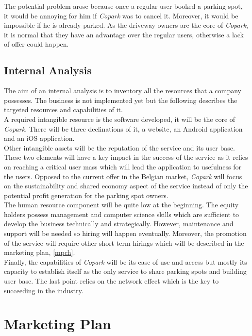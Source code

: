 \documentclass[12pt,a4paper,oneside]{book}
\newcommand{\bp}{\textit{Copark}}
\begin{document}
The potential problem arose because once a regular user booked a parking spot, it would be annoying for him if \bp{} was to cancel it. Moreover, it would be impossible if he is already parked. As the driveway owners are the core of \bp{}, it is normal that they have an advantage over the regular users, otherwise a lack of offer could happen.

\section{Internal Analysis}
The aim of an internal analysis is to inventory all the resources that a company possesses. The business is not implemented yet but the following describes the targeted resources and capabilities of it.\\

A required intangible resource is the software developed, it will be the core of \bp{}. There will be three declinations of it, a website, an Android application and an iOS application.\\

Other intangible assets will be the reputation of the service and its user base. These two elements will have a key impact in the success of the service as it relies on reaching a critical user mass which will lead the application to usefulness for the users. Opposed to the current offer in the Belgian market, \bp{} will focus on the sustainability and shared economy aspect of the service instead of only the potential profit generation for the parking spot owners.\\

The human resource component will be quite low at the beginning. The equity holders possess management and computer science skills which are sufficient to develop the business technically and strategically. However, maintenance and support will be needed so hiring will happen eventually. Moreover, the promotion of the service will require other short-term hirings which will be described in the marketing plan, \autoref{mpch}.\\

Finally, the capabilities of \bp{} will be its ease of use and access but mostly its capacity to establish itself as the only service to share parking spots and building user base. The last point relies on the network effect which is the key to succeeding in the industry.

\chapter{Marketing Plan}
\label{mpch}
\end{document}
